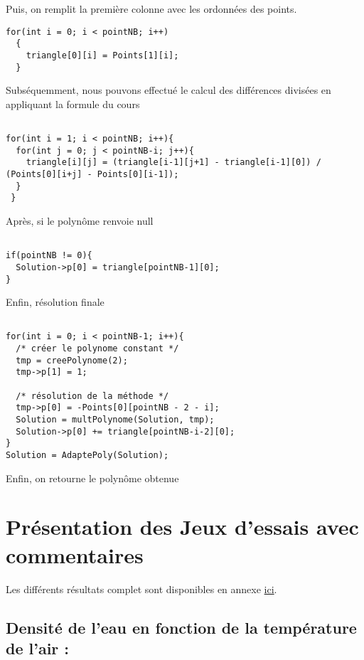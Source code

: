 \documentclass[letter]{article}
\begin{document}
Puis, on remplit la première colonne avec les ordonnées des points.

\begin{verbatim}
for(int i = 0; i < pointNB; i++)  
  {
    triangle[0][i] = Points[1][i];
  }

\end{verbatim}

Subséquemment, nous pouvons effectué le calcul des différences divisées en appliquant la formule du cours

\begin{verbatim}

for(int i = 1; i < pointNB; i++){
  for(int j = 0; j < pointNB-i; j++){
    triangle[i][j] = (triangle[i-1][j+1] - triangle[i-1][0]) / (Points[0][i+j] - Points[0][i-1]);
  }
 }

\end{verbatim}

Après, si le polynôme renvoie null
\begin{verbatim}

if(pointNB != 0){
  Solution->p[0] = triangle[pointNB-1][0];
}

\end{verbatim}


Enfin, résolution finale
\begin{verbatim}

for(int i = 0; i < pointNB-1; i++){
  /* créer le polynome constant */
  tmp = creePolynome(2);
  tmp->p[1] = 1;

  /* résolution de la méthode */
  tmp->p[0] = -Points[0][pointNB - 2 - i];
  Solution = multPolynome(Solution, tmp);
  Solution->p[0] += triangle[pointNB-i-2][0];
}
Solution = AdaptePoly(Solution);

\end{verbatim}

Enfin, on retourne le polynôme obtenue

\section{Présentation des Jeux d'essais avec commentaires}
\label{sec:org8001bfe}

Les différents résultats complet sont disponibles en annexe \hyperref[sec:org01371bb]{ici}.


\subsection{Densité de l'eau en fonction de la température de l'air :}
\label{sec:org905fcc1}
\end{document}
